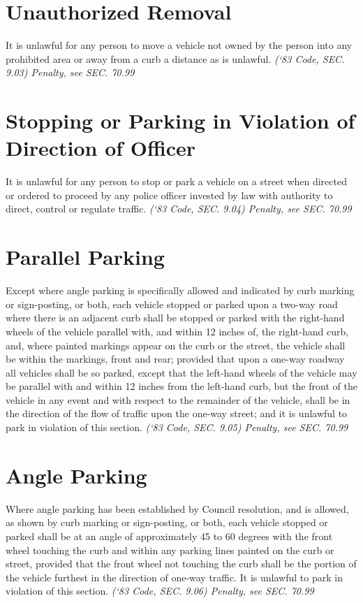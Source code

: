 \documentclass[code.tex]{subfiles}
\begin{document}
\section{Unauthorized Removal}
It is unlawful for any person to move a vehicle not owned by the person into any prohibited area or away from a curb a distance as is unlawful.\newline
\emph{(‘83 Code, SEC. 9.03)  Penalty, see SEC. 70.99}

\section{Stopping or Parking in Violation of Direction of Officer}
It is unlawful for any person to stop or park a vehicle on a street when directed or ordered to proceed by any police officer invested by law with authority to direct, control or regulate traffic.\newline
\emph{(‘83 Code, SEC. 9.04)  Penalty, see SEC. 70.99}

\section{Parallel Parking}
Except where angle parking is specifically allowed and indicated by curb marking or sign-posting, or both, each vehicle stopped or parked upon a two-way road where there is an adjacent curb shall be stopped or parked with the right-hand wheels of the vehicle parallel with, and within 12 inches of, the right-hand curb, and, where painted markings appear on the curb or the street, the vehicle shall be within the markings, front and rear; provided that upon a one-way roadway all vehicles shall be so parked, except that the left-hand wheels of the vehicle may be parallel with and within 12 inches from the left-hand curb, but the front of the vehicle in any event and with respect to the remainder of the vehicle, shall be in the direction of the flow of traffic upon the one-way street; and it is unlawful to park in violation of this section.\newline
\emph{(‘83 Code, SEC. 9.05)  Penalty, see SEC. 70.99}

\section{Angle Parking}
Where angle parking has been established by Council resolution, and is allowed, as shown by curb marking or sign-posting, or both, each vehicle stopped or parked shall be at an angle of approximately 45 to 60 degrees with the front wheel touching the curb and within any parking lines painted on the curb or street, provided that the front wheel not touching the curb shall be the portion of the vehicle furthest in the direction of one-way traffic.  It is unlawful to park in violation of this section.\newline
\emph{(‘83 Code, SEC. 9.06)  Penalty, see SEC. 70.99}
\end{document}
